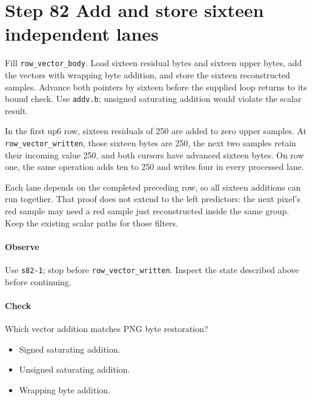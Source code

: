 \section{Step 82 Add and store sixteen independent lanes}
Fill \texttt{row\_vector\_body}. Load sixteen residual bytes and sixteen upper bytes, add the vectors with wrapping byte addition, and store the sixteen reconstructed samples. Advance both pointers by sixteen before the supplied loop returns to its bound check. Use \texttt{addv.b}; unsigned saturating addition would violate the scalar result.

In the first up6 row, sixteen residuals of 250 are added to zero upper samples. At \texttt{row\_vector\_written}, those sixteen bytes are 250, the next two samples retain their incoming value 250, and both cursors have advanced sixteen bytes. On row one, the same operation adds ten to 250 and writes four in every processed lane.

Each lane depends on the completed preceding row, so all sixteen additions can run together. That proof does not extend to the left predictors: the next pixel’s red sample may need a red sample just reconstructed inside the same group. Keep the existing scalar paths for those filters.

\paragraph{Observe} Use \texttt{s82-1}; stop before \texttt{row\_vector\_written}. Inspect the state described above before continuing.

\paragraph{Check} Which vector addition matches PNG byte restoration?
\begin{itemize}
  \item[A.] Signed saturating addition.
  \item[B.] Unsigned saturating addition.
  \item[C.] Wrapping byte addition.
\end{itemize}

